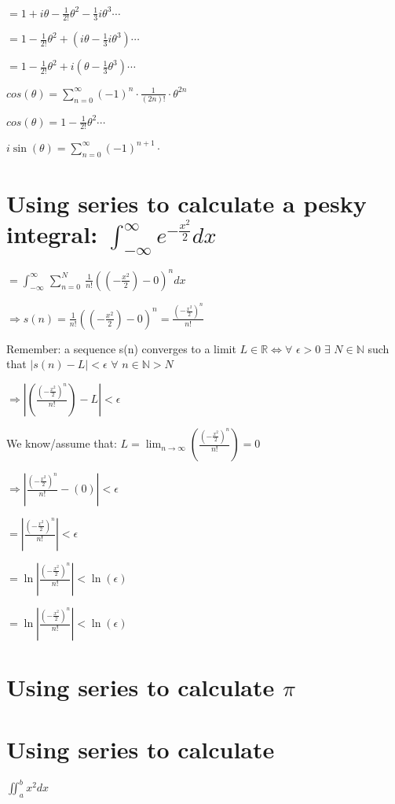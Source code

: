 \documentclass{article}
\begin{document}
\begin{enumerate}[a.]
	$ = 1 + i\theta - \frac{1}{2!}\theta^2 - \frac{1}{3}i\theta^3  \cdots$

	$ = 1 - \frac{1}{2!}\theta^2 + (i\theta - \frac{1}{3}i\theta^3)  \cdots$

	$ = 1 - \frac{1}{2!}\theta^2 + i(\theta - \frac{1}{3}\theta^3)  \cdots$

	$cos(\theta) = \sum_{n=0}^{\infty} (-1)^n \cdot \frac{1}{(2n)!} \cdot \theta^{2n}$

	$cos(\theta) = 1 - \frac{1}{2!}\theta^2 \cdots$

	$i\sin(\theta) = \sum_{n=0}^{\infty} (-1)^{n+1} \cdot $

\end{enumerate}

\section{Using series to calculate a pesky integral: $\int _{-\infty }^{\infty \:}e^{-\frac{x^2}{2}}dx$}

    $= \int _{-\infty \:}^{\infty \:\:}\sum _{n=0}^N\:\frac{1}{n!}\left(\left(-\frac{x^2}{2}\right)-0\right)^n dx$

    $\Rightarrow s(n) = \frac{1}{n!}\left(\left(-\frac{x^2}{2}\right)-0\right)^n = \frac{\left(-\frac{x^2}{2}\right)^n}{n!}$

    Remember: a sequence s(n) converges to a limit
    $L \in\mathbb{R}\iff\forall $
    $\epsilon > 0$
    $ \exists $
    $ N \in \mathbb{N} $
    such that
    $ |s(n) - L| < \epsilon $
    $\forall$
    $ n \in \mathbb{N} > N$

    $\Rightarrow |(\frac{\left(-\frac{x^2}{2}\right)^n}{n!}) - L| < \epsilon$

    We know/assume that: $L = \lim _{n\to \infty }\left(\frac{\left(-\frac{x^2}{2}\right)^n}{n!}\right) = 0$

    $\Rightarrow |\frac{\left(-\frac{x^2}{2}\right)^n}{n!} - (0)| < \epsilon$

    $ = |\frac{\left(-\frac{x^2}{2}\right)^n}{n!}| < \epsilon$

    $ = \ln|\frac{\left(-\frac{x^2}{2}\right)^n}{n!}| < \ln(\epsilon)$

    $ = \ln|\frac{\left(-\frac{x^2}{2}\right)^n}{n!}| < \ln(\epsilon)$

\section{Using series to calculate $\pi$}

\section{Using series to calculate}

$\iint_{a}^{b} x^2 dx$
\end{document}
